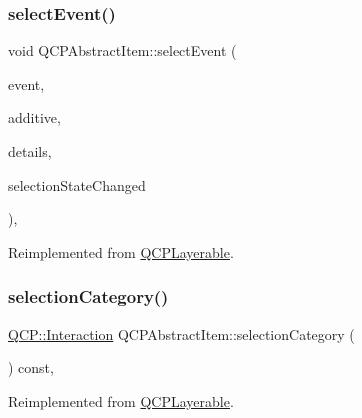 \mbox{\label{class_q_c_p_abstract_item_aa4b969c58797f39c9c0b6c07c7869d17}} 
\subsubsection{\texorpdfstring{select\+Event()}{selectEvent()}}
{\footnotesize\ttfamily void Q\+C\+P\+Abstract\+Item\+::select\+Event (\begin{DoxyParamCaption}\item[{Q\+Mouse\+Event $\ast$}]{event,  }\item[{bool}]{additive,  }\item[{const Q\+Variant \&}]{details,  }\item[{bool $\ast$}]{selection\+State\+Changed }\end{DoxyParamCaption})\hspace{0.3cm}{\ttfamily [protected]}, {\ttfamily [virtual]}}



Reimplemented from \hyperlink{class_q_c_p_layerable_a7498c2d0d081cf7cad0fb3bb93aa0e91}{Q\+C\+P\+Layerable}.

\mbox{\label{class_q_c_p_abstract_item_aceb5f99c361cf023c7cbe7339ea29571}} 
\subsubsection{\texorpdfstring{selection\+Category()}{selectionCategory()}}
{\footnotesize\ttfamily \hyperlink{namespace_q_c_p_a2ad6bb6281c7c2d593d4277b44c2b037}{Q\+C\+P\+::\+Interaction} Q\+C\+P\+Abstract\+Item\+::selection\+Category (\begin{DoxyParamCaption}{ }\end{DoxyParamCaption}) const\hspace{0.3cm}{\ttfamily [protected]}, {\ttfamily [virtual]}}



Reimplemented from \hyperlink{class_q_c_p_layerable_a908c9edda761886f33893be326dab77d}{Q\+C\+P\+Layerable}.

